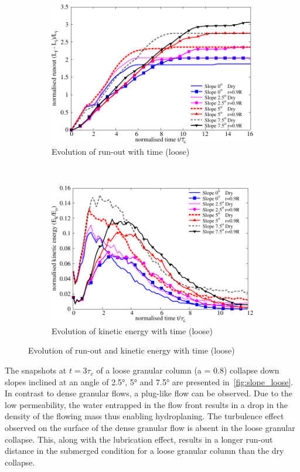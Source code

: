 \begin{figure}
\centering
\begin{subfigure}[b]{0.95\textwidth}
\centering
\includegraphics[width=0.97\columnwidth]{Runout_loose_slope}
\caption{Evolution of run-out with time (loose)}
\label{fig:run_loose}
\end{subfigure} \\
\begin{subfigure}[b]{0.95\textwidth}
\centering
\includegraphics[width=0.97\columnwidth]{KE_loose_slope}
\caption{Evolution of kinetic energy with time (loose)}
\label{fig:KE_loose}
\end{subfigure}
\caption{Evolution of run-out and kinetic energy with time (loose)}
\label{fig:KE_run_loose}
\end{figure}

The snapshots at $t = 3\tau_c$ of a loose granular column (a = 0.8) collapse 
down slopes inclined at an angle of 2.5\si{\degree}, 5\si{\degree} and 
7.5\si{\degree} are presented in~\cref{fig:slope_loose}. In contrast to dense 
granular flows, a plug-like flow can be observed. Due to the low permeability, 
the 
water entrapped in the flow front results in a drop in the density of the 
flowing mass thus enabling hydroplaning. The turbulence effect observed on the 
surface of the dense granular flow is absent in the loose granular collapse. 
This, along with the lubrication effect, results in a longer run-out distance 
in the submerged condition for a loose granular column than the dry collapse. 

